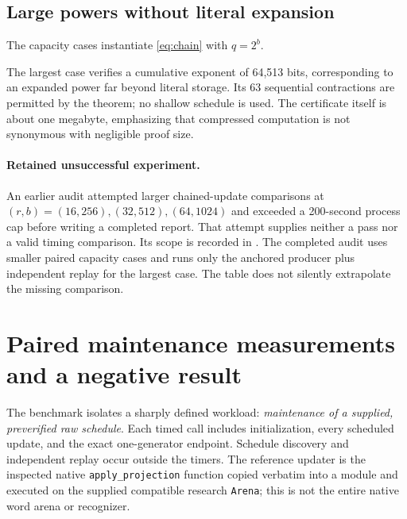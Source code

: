 \documentclass[11pt,letterpaper]{article}
\theoremstyle{definition}
\theoremstyle{remark}\newtheorem{remark}[theorem]{Remark}
\newcommand{\code}[1]{\texttt{\small #1}}
\begin{document}
\subsection{Large powers without literal expansion}

The capacity cases instantiate \eqref{eq:chain} with $q=2^b$.
\begin{table}[htbp]\centering\small

\caption{Completed capacity checks. The final row uses the anchored producer
and independent source replay only; the dash is not a measured chained result.
Proof bytes are the retained JSON serialization counts.}
\label{tab:capacity}
\end{table}

The largest case verifies a cumulative exponent of 64,513 bits, corresponding
to an expanded power far beyond literal storage. Its 63 sequential contractions
are permitted by the theorem; no shallow schedule is used. The certificate
itself is about one megabyte, emphasizing that compressed computation is not
synonymous with negligible proof size.

\paragraph{Retained unsuccessful experiment.}
An earlier audit attempted larger chained-update comparisons at
$(r,b)=(16,256),(32,512),(64,1024)$ and exceeded a 200-second process cap before
writing a completed report. That attempt supplies neither a pass nor a valid
timing comparison. Its scope is recorded in
. The completed audit uses smaller paired
capacity cases and runs only the anchored producer plus independent replay
for the largest case. The table does not silently extrapolate the missing
comparison.

\section{Paired maintenance measurements and a negative result}
\label{sec:benchmark}

The benchmark isolates a sharply defined workload: \emph{maintenance of a
supplied, preverified raw schedule}. Each timed call includes initialization,
every scheduled update, and the exact one-generator endpoint. Schedule
discovery and independent replay occur outside the timers. The reference
updater is the inspected native \code{apply\_projection} function copied
verbatim into a module and executed on the supplied compatible research
\code{Arena}; this is not the entire native word arena or recognizer.
\end{document}
